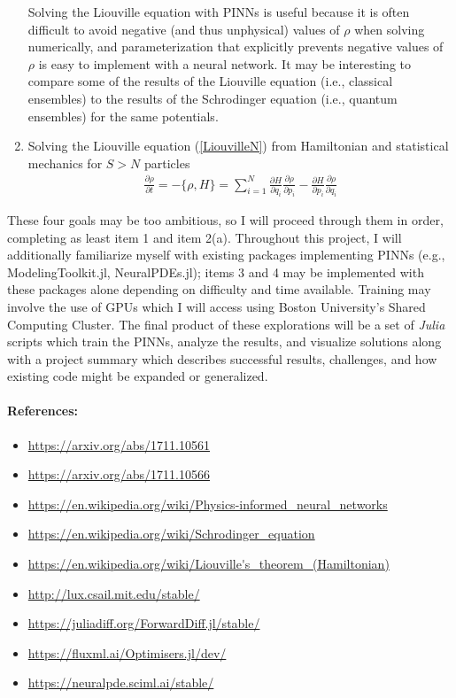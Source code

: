 \documentclass[10pt]{article}
\newcommand{\1}{\mathbf 1}
\begin{document}
\begin{enumerate}
	Solving the Liouville equation with PINNs is useful because it is often difficult to avoid negative (and thus unphysical) values of $\rho$ when solving numerically, and parameterization that explicitly prevents negative values of $\rho$ is easy to implement with a neural network.
	It may be interesting to compare some of the results of the Liouville equation (i.e., classical ensembles) to the results of the Schrodinger equation (i.e., quantum ensembles) for the same potentials.
	\item Solving the Liouville equation (\ref{LiouvilleN}) from Hamiltonian and statistical mechanics for $S > N$ particles
	\begin{align}
		\label{LiouvilleN}
		\frac{\partial \rho}{\partial t}
		=
		-
		\{ \rho, H\}
		=
		\sum_{i = 1}^N
		\frac{\partial H}{\partial q_i}
		\frac{\partial \rho}{\partial p_i}
		-
		\frac{\partial H}{\partial p_i}
		\frac{\partial \rho}{\partial q_i}
	\end{align}
\end{enumerate}
These four goals may be too ambitious, so I will proceed through them in order, completing as least item 1 and item 2(a).
Throughout this project, I will additionally familiarize myself with existing packages implementing PINNs (e.g., ModelingToolkit.jl, NeuralPDEs.jl); items 3 and 4 may be implemented with these packages alone depending on difficulty and time available.
Training may involve the use of GPUs which I will access using Boston University's Shared Computing Cluster.
The final product of these explorations will be a set of {\em Julia} scripts which train the PINNs, analyze the results, and visualize solutions along with a project summary which describes successful results, challenges, and how existing code might be expanded or generalized.

\paragraph{References:}

\begin{itemize}
	\item \url{https://arxiv.org/abs/1711.10561}
	\item \url{https://arxiv.org/abs/1711.10566}
	\item \url{https://en.wikipedia.org/wiki/Physics-informed_neural_networks}
	\item \url{https://en.wikipedia.org/wiki/Schrodinger_equation}
	\item \url{https://en.wikipedia.org/wiki/Liouville's_theorem_(Hamiltonian)}
	\item \url{http://lux.csail.mit.edu/stable/}
	\item \url{https://juliadiff.org/ForwardDiff.jl/stable/}
	\item \url{https://fluxml.ai/Optimisers.jl/dev/}
	\item \url{https://neuralpde.sciml.ai/stable/}
\end{itemize}
\end{document}
